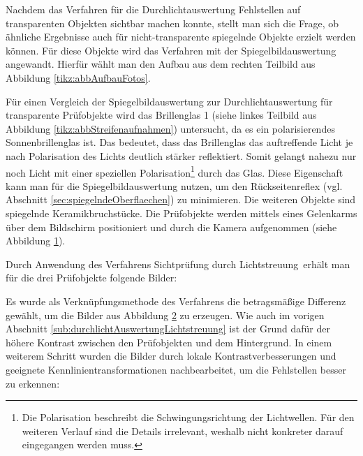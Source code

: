 Nachdem das Verfahren für die Durchlichtauswertung Fehlstellen auf transparenten Objekten sichtbar machen konnte, stellt man sich die Frage, ob ähnliche Ergebnisse auch für nicht-transparente spiegelnde Objekte erzielt werden können.
Für diese Objekte wird das Verfahren mit der Spiegelbildauswertung angewandt.
Hierfür wählt man den Aufbau aus dem rechten Teilbild aus Abbildung \ref{tikz:abbAufbauFotos}.

\p
Für einen Vergleich der Spiegelbildauswertung zur Durchlichtauswertung für transparente Prüfobjekte wird das Brillenglas 1 (siehe linkes Teilbild aus Abbildung \ref{tikz:abbStreifenaufnahmen}) untersucht, da es ein polarisierendes Sonnenbrillenglas ist.
Das bedeutet, dass das Brillenglas das auftreffende Licht je nach Polarisation des Lichts deutlich stärker reflektiert.
Somit gelangt nahezu nur noch Licht mit einer speziellen Polarisation\footnote{
Die Polarisation beschreibt die Schwingungsrichtung der Lichtwellen.
Für den weiteren Verlauf sind die Details irrelevant, weshalb nicht konkreter darauf eingegangen werden muss.
} durch das Glas.
Diese Eigenschaft kann man für die Spiegelbildauswertung nutzen, um den Rückseitenreflex (vgl. Abschnitt \ref{sec:spiegelndeOberflaechen}) zu minimieren.
Die weiteren Objekte sind spiegelnde Keramikbruchstücke.
Die Prüfobjekte werden mittels eines Gelenkarms über dem Bildschirm positioniert und durch die Kamera aufgenommen (siehe Abbildung \ref{tikz:abbStreifenaufnahmenSpLichtstreuung}).

{
	\begin{figure}[H]
		\centering
		
		\label{tikz:abbStreifenaufnahmenSpLichtstreuung}
	\end{figure}
}

\noindent
Durch Anwendung des Verfahrens \glqq Sichtprüfung durch Lichtstreuung\grqq ~erhält man für die drei Prüfobjekte folgende Bilder:

{
	\begin{figure}[H]
		\centering
		
		\label{tikz:abbCombinePatternPicturesSpLichtstreuung}
	\end{figure}
}

\noindent
Es wurde als Verknüpfungsmethode des Verfahrens die betragsmäßige Differenz gewählt, um die Bilder aus Abbildung \ref{tikz:abbCombinePatternPicturesSpLichtstreuung} zu erzeugen.
Wie auch im vorigen Abschnitt \ref{sub:durchlichtAuswertungLichtstreuung} ist der Grund dafür der höhere Kontrast zwischen den Prüfobjekten und dem Hintergrund.
In einem weiterem Schritt wurden die Bilder durch lokale Kontrastverbesserungen und geeignete Kennlinientransformationen nachbearbeitet, um die Fehlstellen besser zu erkennen:

